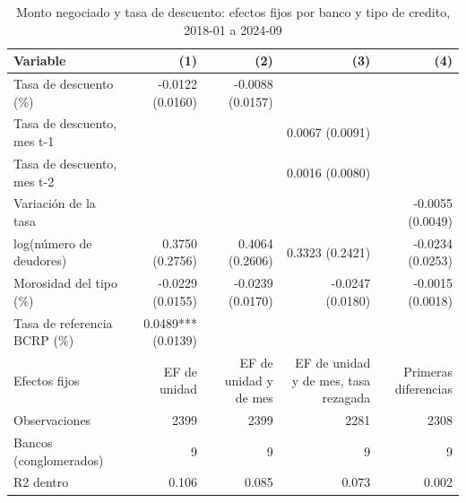\begin{table}[htbp]
\caption{Monto negociado y tasa de descuento: efectos fijos por banco y tipo de credito, 2018-01 a 2024-09}
\label{tab:modelo}
\begin{tabular}{lrrrr}
\toprule
Variable & (1) & (2) & (3) & (4) \\
\midrule
Tasa de descuento (\%) & -0.0122 (0.0160) & -0.0088 (0.0157) &  &  \\
Tasa de descuento, mes t-1 &  &  & 0.0067 (0.0091) &  \\
Tasa de descuento, mes t-2 &  &  & 0.0016 (0.0080) &  \\
Variación de la tasa &  &  &  & -0.0055 (0.0049) \\
log(número de deudores) & 0.3750 (0.2756) & 0.4064 (0.2606) & 0.3323 (0.2421) & -0.0234 (0.0253) \\
Morosidad del tipo (\%) & -0.0229 (0.0155) & -0.0239 (0.0170) & -0.0247 (0.0180) & -0.0015 (0.0018) \\
Tasa de referencia BCRP (\%) & 0.0489*** (0.0139) &  &  &  \\
Efectos fijos & EF de unidad & EF de unidad y de mes & EF de unidad y de mes, tasa rezagada & Primeras diferencias \\
Observaciones & 2399 & 2399 & 2281 & 2308 \\
Bancos (conglomerados) & 9 & 9 & 9 & 9 \\
R2 dentro & 0.106 & 0.085 & 0.073 & 0.002 \\
\bottomrule
\end{tabular}
\end{table}

